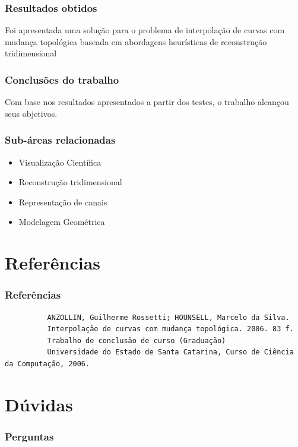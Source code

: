 \documentclass{beamer}
\begin{document}
\begin{frame}[fragile]
  \frametitle{Resultados obtidos}
  Foi apresentada uma solução para o problema de interpolação de curvas com mudança topológica baseada em abordagens heurísticas de reconstrução tridimensional

\end{frame}

\begin{frame}[fragile]
  \frametitle{Conclusões do trabalho}
  Com base nos resultados apresentados a partir dos testes, o trabalho alcançou seus objetivos.
\end{frame}


\begin{frame}[fragile]
  \frametitle{Sub-áreas relacionadas}
  \begin{itemize}
    \item Visualização Científica
    \item Reconstrução tridimensional
    \item Representação de canais
    \item Modelagem Geométrica
  \end{itemize}

\end{frame}


\section{Referências}
\begin{frame}[fragile]
    \frametitle{Referências}
    \begin{footnotesize}
        \begin{verbatim}
          ANZOLLIN, Guilherme Rossetti; HOUNSELL, Marcelo da Silva.
          Interpolação de curvas com mudança topológica. 2006. 83 f.
          Trabalho de conclusão de curso (Graduação)
          Universidade do Estado de Santa Catarina, Curso de Ciência da Computação, 2006.
        \end{verbatim}
    \end{footnotesize}
\end{frame}
    
    
\section{Dúvidas}
\begin{frame}[fragile]
    \frametitle{Perguntas}
        \begin{center}
        \end{center}

\end{frame}
    
\end{document}
